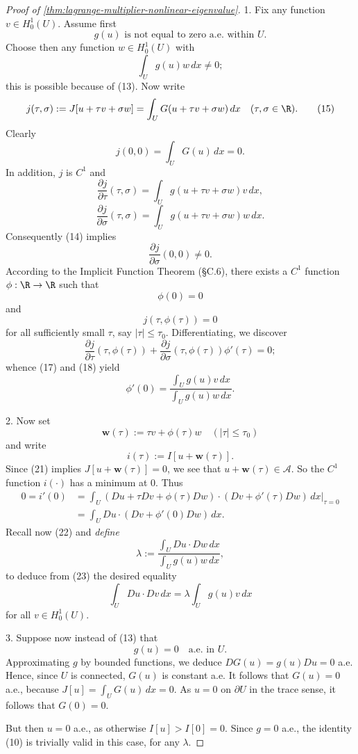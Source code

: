 \begin{proof}[Proof of \cref{thm:lagrange-multiplier-nonlinear-eigenvalue}]
1. Fix any function $v \in H_0^1(U)$. Assume first
\[
g(u) \text{ is not equal to zero a.e. within } U.
\tag{13}
\]
Choose then any function $w \in H_0^1(U)$ with
\[
\int_U g(u)w\, dx \neq 0;
\tag{14}
\]
this is possible because of (13). Now write
\[
j(\tau, \sigma) := J[u + \tau v + \sigma w] = \int_U G(u + \tau v + \sigma w)\, dx \quad (\tau, \sigma \in \R).
\tag{15}
\]
Clearly
\[
j(0,0) = \int_U G(u)\, dx = 0.
\tag{16}
\]
In addition, $j$ is $C^1$ and
\[
\frac{\partial j}{\partial \tau}(\tau, \sigma) = \int_U g(u + \tau v + \sigma w)v\, dx,
\tag{17}
\]
\[
\frac{\partial j}{\partial \sigma}(\tau, \sigma) = \int_U g(u + \tau v + \sigma w)w\, dx.
\tag{18}
\]
Consequently (14) implies
\[
\frac{\partial j}{\partial \sigma}(0, 0) \neq 0.
\tag{19}
\]
According to the Implicit Function Theorem (\S C.6), there exists a $C^1$ function $\phi: \R \to \R$ such that
\[
\phi(0) = 0
\tag{20}
\]
and
\[
j(\tau, \phi(\tau)) = 0
\tag{21}
\]
for all sufficiently small $\tau$, say $|\tau| \leq \tau_0$. Differentiating, we discover
\[
\frac{\partial j}{\partial \tau}(\tau, \phi(\tau)) + \frac{\partial j}{\partial \sigma}(\tau, \phi(\tau))\phi'(\tau) = 0;
\]
whence (17) and (18) yield
\[
\phi'(0) = \frac{\int_U g(u)v\, dx}{\int_U g(u)w\, dx}.
\tag{22}
\]

2. Now set
\[
\mathbf{w}(\tau) := \tau v + \phi(\tau)w \quad (|\tau| \le \tau_0)
\]
and write
\[
i(\tau) := I[u + \mathbf{w}(\tau)].
\]
Since (21) implies $J[u + \mathbf{w}(\tau)] = 0$, we see that $u + \mathbf{w}(\tau) \in \mathcal{A}$. So the $C^1$ function $i(\cdot)$ has a minimum at $0$. Thus
\[
\begin{aligned}
0 = i'(0) &= \int_U (Du + \tau Dv + \phi(\tau)Dw) \cdot (Dv + \phi'(\tau)Dw)\, dx\Big|_{\tau=0} \\
&= \int_U Du \cdot (Dv + \phi'(0)Dw)\, dx.
\end{aligned}
\tag{23}
\]
Recall now (22) and \textit{define}
\[
\lambda := \frac{\int_U Du \cdot Dw\, dx}{\int_U g(u)w\, dx},
\]
to deduce from (23) the desired equality
\[
\int_U Du \cdot Dv\, dx = \lambda \int_U g(u)v\, dx
\]
for all $v \in H_0^1(U)$.

3. Suppose now instead of (13) that
\[
g(u) = 0 \quad \text{a.e. in } U.
\]
Approximating $g$ by bounded functions, we deduce $DG(u) = g(u)Du = 0$ a.e. Hence, since $U$ is connected, $G(u)$ is constant a.e. It follows that $G(u) = 0$ a.e., because $J[u] = \int_U G(u)\, dx = 0$. As $u = 0$ on $\partial U$ in the trace sense, it follows that $G(0) = 0$.

But then $u = 0$ a.e., as otherwise $I[u] > I[0] = 0$. Since $g = 0$ a.e., the identity (10) is trivially valid in this case, for any $\lambda$.
\end{proof}

